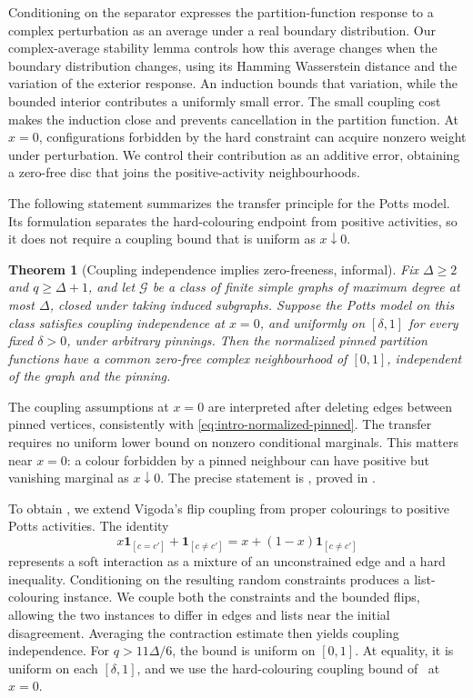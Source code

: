 \documentclass[11pt,reqno]{article}
\theoremstyle{plain}
\newtheorem{theorem}{Theorem}[section]
\theoremstyle{definition}
\theoremstyle{remark}
\theoremstyle{definition}
\theoremstyle{remark}
\newcommand{\one}[1]{\mathbf{1}_{\left[#1\right]}}   %
\newcommand{\Deg}{\Delta}                        %
\begin{document}
Conditioning on the separator expresses the partition-function response
to a complex perturbation as an average under a real boundary
distribution.  Our complex-average stability lemma controls how this
average changes when the boundary distribution changes, using its
Hamming Wasserstein distance and the variation of the exterior response.
An induction bounds that variation, while the bounded interior
contributes a uniformly small error.  The small coupling cost makes the
induction close and prevents cancellation in the partition function.
At \(x=0\), configurations forbidden by the hard constraint can acquire
nonzero weight under perturbation.  We control their contribution as an
additive error, obtaining a zero-free disc that joins the
positive-activity neighbourhoods.

The following statement summarizes the transfer principle for the Potts
model.  Its formulation separates the hard-colouring endpoint from
positive activities, so it does not require a coupling bound that is
uniform as \(x\downarrow0\).

\begin{theorem}[Coupling independence implies zero-freeness, informal]
\label{thm:potts-transfer-informal}
Fix \(\Deg\ge2\) and \(q\ge\Deg+1\), and let \(\mathcal G\) be a class
of finite simple graphs of maximum degree at most \(\Deg\), closed
under taking induced subgraphs.  Suppose the Potts model on this class
satisfies coupling independence at \(x=0\), and uniformly on
\([\delta,1]\) for every fixed \(\delta>0\), under arbitrary pinnings.
Then the normalized pinned partition functions have a common zero-free
complex neighbourhood of \([0,1]\), independent of the graph and the
pinning.
\end{theorem}

The coupling assumptions at \(x=0\) are interpreted after deleting
edges between pinned vertices, consistently with
\eqref{eq:intro-normalized-pinned}.
The transfer requires no uniform lower bound on nonzero conditional
marginals.  This matters near \(x=0\): a colour forbidden by a pinned
neighbour can have positive but vanishing marginal as \(x\downarrow0\).
The precise statement is , proved in
.

To obtain , we extend Vigoda's flip coupling from
proper colourings to positive Potts activities.  The identity
\[
  x\one{c=c'}+\one{c\ne c'}
  =x+(1-x)\one{c\ne c'}
\]
represents a soft interaction as a mixture of an unconstrained edge and
a hard inequality.  Conditioning on the resulting random constraints
produces a list-colouring instance.  We couple both the constraints and
the bounded flips, allowing the two instances to differ in edges and
lists near the initial disagreement.  Averaging the contraction estimate
then yields coupling independence.  For \(q>11\Deg/6\), the bound is
uniform on \([0,1]\).  At equality, it is uniform on each
\([\delta,1]\), and we use the hard-colouring coupling bound
of~\cite[Theorem~20]{CFFGZZ2024} at \(x=0\).
\end{document}
